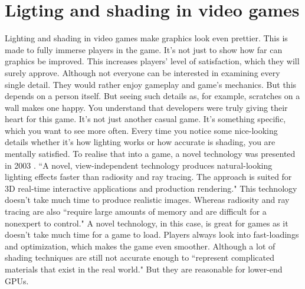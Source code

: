 \documentclass{scrartcl}
\begin{document}
\section{Ligting and shading in video games}
Lighting and shading in video games make graphics look even prettier.
This is made to fully immerse players in the game.
It's not just to show how far can graphics be improved.
This increases players' level of satisfaction, which they will surely approve.
Although not everyone can be interested in examining every single detail.
They would rather enjoy gameplay and game's mechanics.
But this depends on a person itself.
But seeing such details as, for example, scratches on a wall makes one happy.
You understand that developers were truly giving their heart for this game.
It's not just another casual game.
It's something specific, which you want to see more often.
Every time you notice some nice-looking details whether it's how lighting works or how accurate is shading, you are mentally satisfied.
To realise that into a game, a novel technology was presented in 2003 \cite{iones2003fast}.
``A novel, view-independent technology produces natural-looking lighting effects faster than radiosity and ray tracing.
The approach is suited for 3D real-time interactive applications and production rendering." \cite[p.~54]{iones2003fast}
This technology doesn't take much time to produce realistic images.
Whereas radiosity and ray tracing are also ``require large amounts of memory and are difficult for a nonexpert to control." \cite[p.~54]{iones2003fast}
A novel technology, in this case, is great for games as it doesn't take much time for a game to load.
Players always look into fast-loadings and optimization, which makes the game even smoother.
Although a lot of shading techniques are still not accurate enough to ``represent complicated materials that exist in the real world."\cite[p.~1]{mcauley2012practical}
But they are reasonable for lower-end GPUs.
\end{document}
